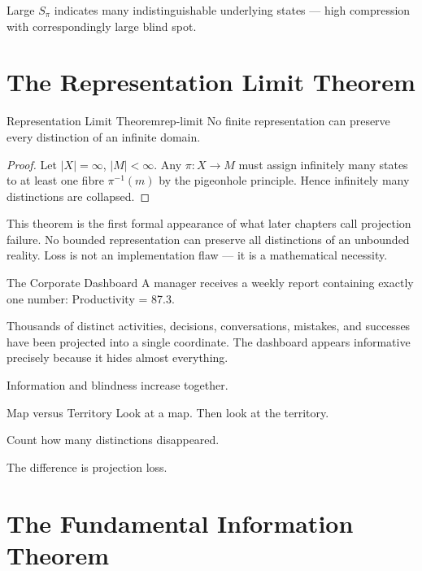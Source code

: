 \documentclass[12pt,twoside,openright]{book}
\begin{document}
Large $S_\pi$ indicates many indistinguishable underlying
states — high compression with correspondingly large
blind spot.

\section{The Representation Limit Theorem}
\label{sec:ch2-limit}

\begin{theorem}{Representation Limit Theorem}{rep-limit}
  No finite representation can preserve every distinction
  of an infinite domain.
\end{theorem}

\begin{proof}
  Let $|X| = \infty$, $|M| < \infty$. Any $\pi: X \to M$
  must assign infinitely many states to at least one
  fibre $\pi^{-1}(m)$ by the pigeonhole principle.
  Hence infinitely many distinctions are collapsed.
\end{proof}

This theorem is the first formal appearance of what
later chapters call projection failure. No bounded
representation can preserve all distinctions of an
unbounded reality. Loss is not an implementation flaw
— it is a mathematical necessity.

\begin{distinctionaside}{The Corporate Dashboard}
A manager receives a weekly report containing exactly one
number: Productivity = 87.3.

Thousands of distinct activities, decisions, conversations,
mistakes, and successes have been projected into a single
coordinate. The dashboard appears informative precisely
because it hides almost everything.

Information and blindness increase together.
\end{distinctionaside}

\begin{distinctionaside}{Map versus Territory}
Look at a map. Then look at the territory.

Count how many distinctions disappeared.

The difference is projection loss.
\end{distinctionaside}

\section{The Fundamental Information Theorem}
\label{sec:ch2-fund}
\end{document}
